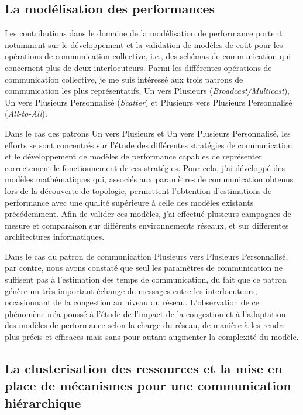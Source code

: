 \documentclass[a4paper]{book}
\begin{document}
\subsection{La modélisation des performances}

Les contributions dans le domaine de la modélisation de performance portent notamment sur le développement et la validation de modèles de coût pour les opérations de communication collective, i.e., des schémas de communication qui concernent plus de deux interlocuteurs. Parmi les différentes opérations de communication collective, je me suis intéressé aux trois patrons de communication les plus représentatifs, Un vers Plusieurs (\textit{Broadcast/Multicast}), Un vers Plusieurs Personnalisé (\textit{Scatter}) et Plusieurs vers Plusieurs Personnalisé (\textit{All-to-All}). 

Dans le cas des patrons Un vers Plusieurs et Un vers Plusieurs Personnalisé, les efforts se sont concentrés sur l'étude des différentes stratégies de communication et le développement de modèles de performance capables de représenter correctement le fonctionnement de ces stratégies. Pour cela, j'ai développé des modèles mathématiques qui, associés aux paramètres de communication obtenus lors de la découverte de topologie, permettent l'obtention d'estimations de performance avec une qualité supérieure à celle des modèles existants précédemment. Afin de valider ces modèles, j'ai effectué plusieurs campagnes de mesure et comparaison sur différents environnements réseaux, et sur différentes architectures informatiques.
     
Dans le cas du patron de communication Plusieurs vers Plusieurs Personnalisé, par contre, nous avons constaté que seul les paramètres de communication ne suffisent pas à l'estimation des temps de communication, du fait que ce patron génère un très important échange de messages entre les interlocuteurs, occasionnant de la congestion au niveau du réseau. L'observation de ce phénomène m'a poussé à l'étude de l'impact de la congestion et à l'adaptation des modèles de performance selon la charge du réseau, de manière à les rendre plus précis et efficaces mais sans pour autant augmenter la complexité du modèle.

\subsection{La clusterisation des ressources et la mise en place de mécanismes pour une communication hiérarchique}
\end{document}
